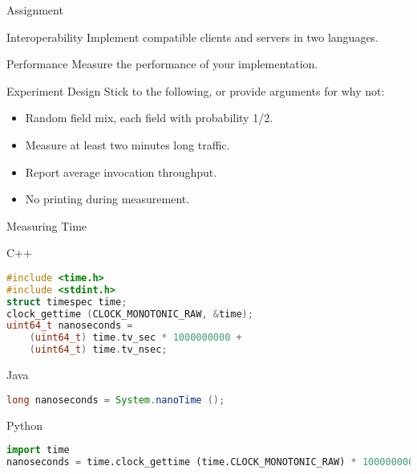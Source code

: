 \begin{frame}{Assignment}
    \begin{block}{Interoperability}
        Implement compatible clients and servers in two languages.
    \end{block}

    \begin{block}{Performance}
        Measure the performance of your implementation.
    \end{block}

    \begin{block}{Experiment Design}
        Stick to the following, or provide arguments for why not:
        \begin{itemize}
            \item Random field mix, each field with probability 1/2.
            \item Measure at least two minutes long traffic.
            \item Report average invocation throughput.
            \item No printing during measurement.
        \end{itemize}
    \end{block}
\end{frame}


\begin{frame}[fragile]{Measuring Time}
    \begin{block}{C++}
\begin{lstlisting}[language=c,style=mini]
#include <time.h>
#include <stdint.h>
struct timespec time;
clock_gettime (CLOCK_MONOTONIC_RAW, &time);
uint64_t nanoseconds =
    (uint64_t) time.tv_sec * 1000000000 +
    (uint64_t) time.tv_nsec;
\end{lstlisting}
    \end{block}
    \begin{block}{Java}
\begin{lstlisting}[language=java,style=mini]
long nanoseconds = System.nanoTime ();
\end{lstlisting}
    \end{block}
    \begin{block}{Python}
\begin{lstlisting}[language=python,style=mini]
import time
nanoseconds = time.clock_gettime (time.CLOCK_MONOTONIC_RAW) * 1000000000
\end{lstlisting}
    \end{block}
\end{frame}





